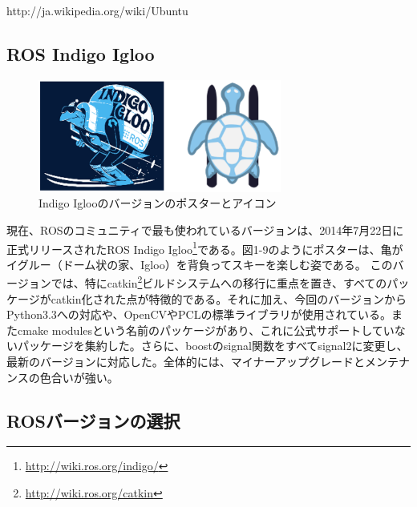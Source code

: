\noindent http://ja.wikipedia.org/wiki/Ubuntu

\subsection{ROS Indigo Igloo}

\begin{figure}[h]
  \centering
  \includegraphics[width=8cm]{pictures/chapter1/pic_01_08.png}
  \caption{Indigo Iglooのバージョンのポスターとアイコン}
\end{figure}

現在、ROSのコミュニティで最も使われているバージョンは、2014年7月22日に正式リリースされたROS Indigo Igloo\footnote{\url{http://wiki.ros.org/indigo/}}である。図1-9のようにポスターは、亀がイグルー（ドーム状の家、Igloo）を背負ってスキーを楽しむ姿である。
このバージョンでは、特にcatkin\footnote{\url{http://wiki.ros.org/catkin}}ビルドシステムへの移行に重点を置き、すべてのパッケージがcatkin化された点が特徴的である。それに加え、今回のバージョンからPython3.3への対応や、OpenCVやPCLの標準ライブラリが使用されている。またcmake modulesという名前のパッケージがあり、これに公式サポートしていないパッケージを集約した。さらに、boostのsignal関数をすべてsignal2に変更し、最新のバージョンに対応した。全体的には、マイナーアップグレードとメンテナンスの色合いが強い。

\subsection{ROSバージョンの選択}

